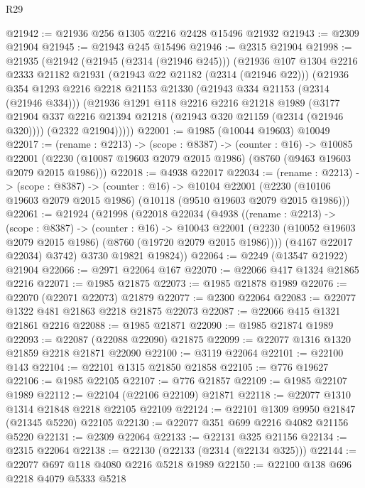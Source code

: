 \begin{lexlean}{R29}
\begin{coremodule}
@21942 := @21936 @256 @1305 @2216 @2428 @15496 @21932
@21943 := @2309 @21904
@21945 := @21943 @245 @15496
@21946 := @2315 @21904
@21998 := @21935
    (@21942
      (@21945 (@2314 (@21946 @245)))
      (@21936
        @107
        @1304
        @2216
        @2333
        @21182
        @21931
        (@21943 @22 @21182 (@2314 (@21946 @22)))
        (@21936
          @354
          @1293
          @2216
          @2218
          @21153
          @21330
          (@21943 @334 @21153 (@2314 (@21946 @334)))
          (@21936
            @1291
            @118
            @2216
            @2216
            @21218
            @1989
            (@3177 @21904 @337 @2216 @21394 @21218 (@21943 @320 @21159 (@2314 (@21946 @320))))
            (@2322 @21904)))))
@22001 := @1985 (@10044 @19603) @10049
@22017 := (rename : @2213) ->
  (scope : @8387) ->
  (counter : @16) ->
  @10085 @22001 (@2230 (@10087 @19603 @2079 @2015 @1986) (@8760 (@9463 @19603 @2079 @2015 @1986)))
@22018 := @4938 @22017
@22034 := (rename : @2213) ->
  (scope : @8387) ->
  (counter : @16) ->
  @10104 @22001 (@2230 (@10106 @19603 @2079 @2015 @1986) (@10118 (@9510 @19603 @2079 @2015 @1986)))
@22061 := @21924
    (@21998
      (@22018
        @22034
        (@4938
          ((rename : @2213) ->
          (scope : @8387) ->
          (counter : @16) ->
          @10043
            @22001
            (@2230 (@10052 @19603 @2079 @2015 @1986) (@8760 (@19720 @2079 @2015 @1986))))
          (@4167 @22017 @22034)
          @3742)
        @3730
        @19821
        @19824))
@22064 := @2249 (@13547 @21922) @21904
@22066 := @2971 @22064 @167
@22070 := @22066 @417 @1324 @21865 @2216
@22071 := @1985 @21875
@22073 := @1985 @21878 @1989
@22076 := @22070 (@22071 @22073) @21879
@22077 := @2300 @22064
@22083 := @22077 @1322 @481 @21863 @2218 @21875 @22073
@22087 := @22066 @415 @1321 @21861 @2216
@22088 := @1985 @21871
@22090 := @1985 @21874 @1989
@22093 := @22087 (@22088 @22090) @21875
@22099 := @22077 @1316 @1320 @21859 @2218 @21871 @22090
@22100 := @3119 @22064
@22101 := @22100 @143
@22104 := @22101 @1315 @21850 @21858
@22105 := @776 @19627
@22106 := @1985 @22105
@22107 := @776 @21857
@22109 := @1985 @22107 @1989
@22112 := @22104 (@22106 @22109) @21871
@22118 := @22077 @1310 @1314 @21848 @2218 @22105 @22109
@22124 := @22101 @1309 @9950 @21847 (@21345 @5220) @22105
@22130 := @22077 @351 @699 @2216 @4082 @21156 @5220
@22131 := @2309 @22064
@22133 := @22131 @325 @21156
@22134 := @2315 @22064
@22138 := @22130 (@22133 (@2314 (@22134 @325)))
@22144 := @22077 @697 @118 @4080 @2216 @5218 @1989
@22150 := @22100 @138 @696 @2218 @4079 @5333 @5218

\end{coremodule}
\end{lexlean}
